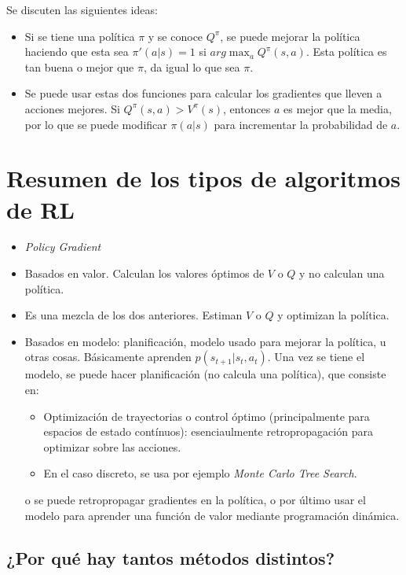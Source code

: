 Se discuten las siguientes ideas:
\begin{itemize}
    \item Si se tiene una política $\pi$ y se conoce $Q^\pi$, se puede mejorar la política
        haciendo que esta sea $\pi'(a|s)=1$ si  $arg\max_a Q^\pi(s,a)$. Esta política es tan
        buena o mejor que $\pi$, da igual lo que sea $\pi$.
    \item Se puede usar estas dos funciones para calcular los gradientes que lleven a acciones
        mejores. Si $Q^\pi(s,a) > V^\pi(s)$, entonces  $a$ es mejor que la media, por lo que se
        puede modificar $\pi(a|s)$ para incrementar la probabilidad de $a$.
\end{itemize}

\section{Resumen de los tipos de algoritmos de RL}%
\label{sec:resumen_de_los_tipos_de_algoritmos_de_rl}

\begin{itemize}
    \item \textit{Policy Gradient}
    \item Basados en valor. Calculan los valores óptimos de $V$ o $Q$ y no calculan una
        política.
    \item Es una mezcla de los dos anteriores. Estiman $V$ o $Q$ y optimizan la política.
    \item Basados en modelo: planificación, modelo usado para mejorar la política, u otras
        cosas. Básicamente aprenden $p(s_{t+1} | s_t, a_t)$. Una vez se tiene el modelo, se
        puede hacer planificación (no calcula una política), que consiste en:
        \begin{itemize}
            \item Optimización de trayectorias o control óptimo (principalmente para
                espacios de estado contínuos): esenciaulmente retropropagación
                para optimizar sobre las acciones.
            \item En el caso discreto, se usa por ejemplo \textit{Monte Carlo Tree Search}.
        \end{itemize}
        o se puede retropropagar gradientes en la política, o por último usar el modelo para
        aprender una función de valor mediante programación dinámica.
\end{itemize}

\subsection{¿Por qué hay tantos métodos distintos?}%
\label{sub:_por_qué_hay_tantos_métodos_distintos_}

